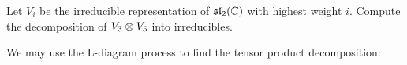 \documentclass[12pt]{memoir}
\begin{document}
\begin{Ej}
    Let $V_i$ be the irreducible representation of $\gsl_2(\bC)$ with highest weight $i$. Compute the
decomposition of $V_3\ox V_5$ into irreducibles.
\end{Ej}

\begin{ptcbr}
    We may use the L-diagram process to find the tensor product decomposition:
    \begin{center}
        


\begin{tikzpicture}[x=0.75pt,y=0.75pt,yscale=-1,xscale=1]


\end{tikzpicture}
\end{center}
\end{ptcbr}
\end{document}
